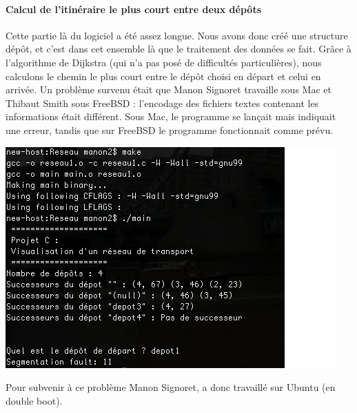 \documentclass[12pt,a4paper]{report}
\begin{document}
\paragraph{Calcul de l'itinéraire le plus court entre deux dépôts}
Cette partie là du logiciel a été assez longue. Nous avons donc créé une structure dépôt, et c'est dans cet ensemble là que le traitement des données se fait. Grâce à l'algorithme de Dijkstra (qui n'a pas posé de difficultés particulières), nous calculons le chemin le plus court entre le dépôt choisi en départ et celui en arrivée. Un problème survenu était que Manon Signoret travaille sous Mac et Thibaut Smith sous FreeBSD : l'encodage des fichiers textes contenant les informations était différent. Sous Mac, le programme se lançait mais indiquait une erreur, tandis que sur FreeBSD le programme fonctionnait comme prévu.
\begin{center}
\includegraphics[scale=0.6]{capture1.png}
\label{fig3}
\end{center}
Pour subvenir à ce problème Manon Signoret, a donc travaillé sur Ubuntu (en double boot).
\end{document}
